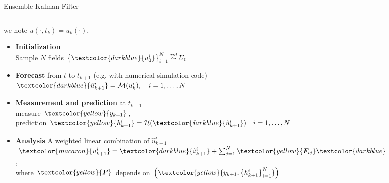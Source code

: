 \documentclass[aspectratio=169]{beamer} %
\begin{document}
\begin{frame}{Ensemble Kalman Filter}
    \begin{columns}
        \begin{column}{0.6\textwidth}
            \small
            we note $u(\cdot, t_{k}) = u_k(\cdot)$,
            \begin{itemize}
                \item<1-> \textbf{Initialization} \\
                    Sample $N$ fields $\left\{\textcolor{darkblue}{u^i_0}\right\}_{i=1}^N \stackrel{iid}{\sim} U_0$
                    \vfill
                \item<2-> \textbf{Forecast} from $t$ to $t_{k+1}$ (e.g. with numerical simulation code) \\
                    $\textcolor{darkblue}{\hat u^i_{k+1}} = \mathcal M(u_k^i), \quad i = 1, \dots, N$
                    \vfill
                \item<3-> \textbf{Measurement and prediction} at $t_{k+1}$\\
                    measure $\textcolor{yellow}{y_{k+1}}$, \\
                    prediction $\textcolor{yellow}{h^i_{k+1}} = \mathcal H (\textcolor{darkblue}{\hat u^i_{k+1}}) \quad i = 1, \dots, N$
                    \vfill
                \item<4-> \textbf{Analysis} A weighted linear combination of $\hat u_{k+1}^i$ \\
                    $\textcolor{macaron}{u^i_{k+1}} = \textcolor{darkblue}{\hat u^i_{k+1}} + \sum_{j=1}^N \textcolor{yellow}{\bm F_{ij}} \textcolor{darkblue}{\hat u^i_{k+1}}$, \\ where $\textcolor{yellow}{\bm F}$ depends on $\left(\textcolor{yellow}{y_{k+1}, \left\{h^i_{k+1}\right\}_{i=1}^N}\right)$\footnotemark[1]
            \end{itemize}
        \end{column}
        \begin{column}{0.4\textwidth}
            \begin{figure}
                \centering

\end{figure}
\end{column}
\end{columns}
\end{frame}
\end{document}
